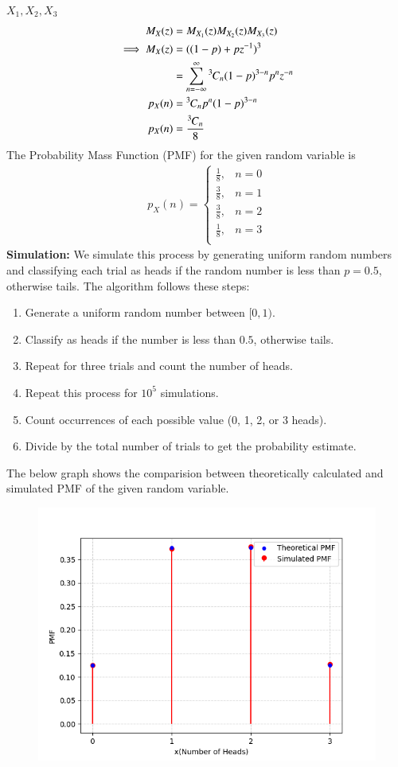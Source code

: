 \documentclass[journal]{IEEEtran}
\begin{document}
     $X_1,X_2,X_3 $
    \begin{align}
        M_X(z) &= M_{X_1}(z)M_{X_2}(z)M_{X_3}(z)\\
        \implies M_X(z) &= ((1-p)+pz^{-1})^3\\
        &= \sum_{n=-\infty}^{\infty}{{}^{3}\mkern-1muC_{n}}(1-p)^{3-n}p^nz^{-n}\\
	p_{X}(n) &= {{}^{3}\mkern-1muC_{n}}p^{n}(1-p)^{3-n}\\
	p_{X}(n) &= \frac{{{}^{3}\mkern-1muC_{n}}}{8}
    \end{align}
    The Probability Mass Function (PMF) for the given random variable is
\begin{align}
p_X(n) =
\begin{cases}
	\frac{1}{8}, & n = 0 \\
	\frac{3}{8}, & n = 1 \\
	\frac{3}{8}, & n = 2 \\
	\frac{1}{8}, & n = 3 \\
\end{cases}
\end{align}
\textbf{Simulation:}
We simulate this process by generating uniform random numbers and classifying each trial as heads if the random number is less than $p=0.5$, otherwise tails. The algorithm follows these steps:
\begin{enumerate}
\item Generate a uniform random number between $[0,1)$.
\item Classify as heads if the number is less than $0.5$, otherwise tails.
\item Repeat for three trials and count the number of heads.
\item Repeat this process for $10^5$ simulations.
\item Count occurrences of each possible value (0, 1, 2, or 3 heads).
\item Divide by the total number of trials to get the probability estimate.
\end{enumerate}
The below graph shows the comparision between theoretically calculated and simulated PMF of the given random variable.
\begin{figure}[htbp]
  \centering
  \includegraphics[width=\columnwidth]{figs/curve.png}
\end{figure}
\end{document}
